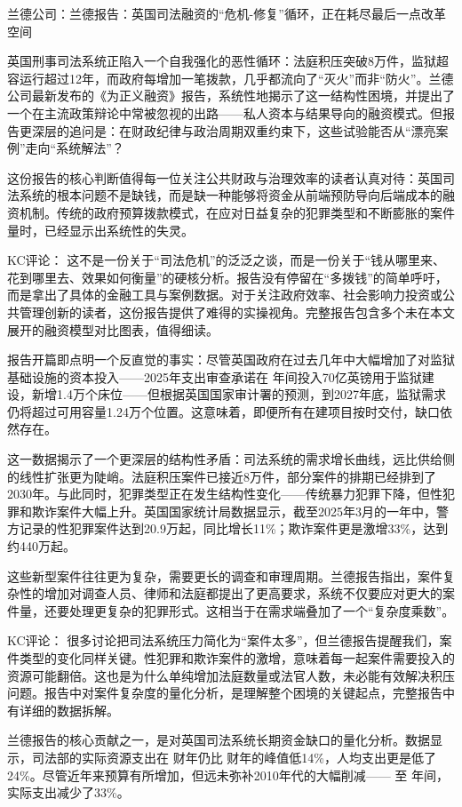 \documentclass[11pt]{ctexart}
\begin{document}
兰德公司：兰德报告：英国司法融资的“危机-修复”循环，正在耗尽最后一点改革空间

英国刑事司法系统正陷入一个自我强化的恶性循环：法庭积压突破8万件，监狱超容运行超过12年，而政府每增加一笔拨款，几乎都流向了“灭火”而非“防火”。兰德公司最新发布的《为正义融资》报告，系统性地揭示了这一结构性困境，并提出了一个在主流政策辩论中常被忽视的出路——私人资本与结果导向的融资模式。但报告更深层的追问是：在财政纪律与政治周期双重约束下，这些试验能否从“漂亮案例”走向“系统解法”？

这份报告的核心判断值得每一位关注公共财政与治理效率的读者认真对待：英国司法系统的根本问题不是缺钱，而是缺一种能够将资金从前端预防导向后端成本的融资机制。传统的政府预算拨款模式，在应对日益复杂的犯罪类型和不断膨胀的案件量时，已经显示出系统性的失灵。

KC评论： 这不是一份关于“司法危机”的泛泛之谈，而是一份关于“钱从哪里来、花到哪里去、效果如何衡量”的硬核分析。报告没有停留在“多拨钱”的简单呼吁，而是拿出了具体的金融工具与案例数据。对于关注政府效率、社会影响力投资或公共管理创新的读者，这份报告提供了难得的实操视角。完整报告包含多个未在本文展开的融资模型对比图表，值得细读。

报告开篇即点明一个反直觉的事实：尽管英国政府在过去几年中大幅增加了对监狱基础设施的资本投入——2025年支出审查承诺在 年间投入70亿英镑用于监狱建设，新增1.4万个床位——但根据英国国家审计署的预测，到2027年底，监狱需求仍将超过可用容量1.24万个位置。这意味着，即便所有在建项目按时交付，缺口依然存在。

这一数据揭示了一个更深层的结构性矛盾：司法系统的需求增长曲线，远比供给侧的线性扩张更为陡峭。法庭积压案件已接近8万件，部分案件的排期已经排到了2030年。与此同时，犯罪类型正在发生结构性变化——传统暴力犯罪下降，但性犯罪和欺诈案件大幅上升。英国国家统计局数据显示，截至2025年3月的一年中，警方记录的性犯罪案件达到20.9万起，同比增长11\%；欺诈案件更是激增33\%，达到约440万起。

这些新型案件往往更为复杂，需要更长的调查和审理周期。兰德报告指出，案件复杂性的增加对调查人员、律师和法庭都提出了更高要求，系统不仅要应对更大的案件量，还要处理更复杂的犯罪形式。这相当于在需求端叠加了一个“复杂度乘数”。

KC评论： 很多讨论把司法系统压力简化为“案件太多”，但兰德报告提醒我们，案件类型的变化同样关键。性犯罪和欺诈案件的激增，意味着每一起案件需要投入的资源可能翻倍。这也是为什么单纯增加法庭数量或法官人数，未必能有效解决积压问题。报告中对案件复杂度的量化分析，是理解整个困境的关键起点，完整报告中有详细的数据拆解。

兰德报告的核心贡献之一，是对英国司法系统长期资金缺口的量化分析。数据显示，司法部的实际资源支出在 财年仍比 财年的峰值低14\%，人均支出更是低了24\%。尽管近年来预算有所增加，但远未弥补2010年代的大幅削减—— 至 年间，实际支出减少了33\%。
\end{document}

